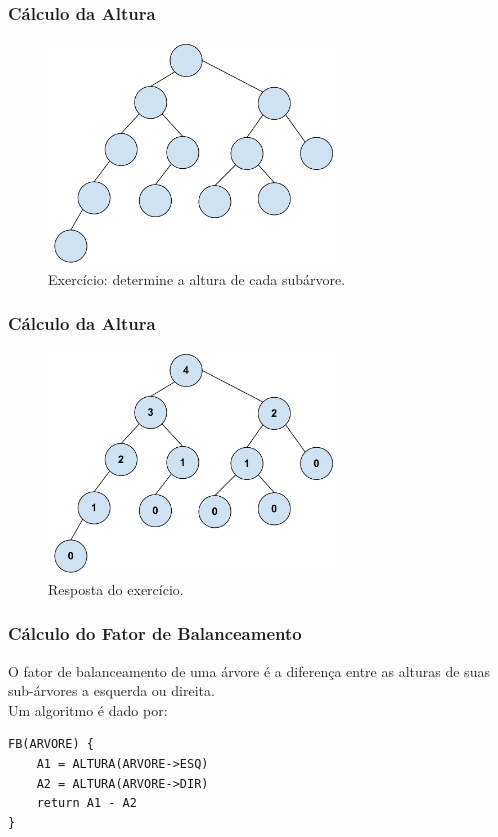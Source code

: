 \begin{frame}
\frametitle{Cálculo da Altura}


\begin{figure}[tbp]
\includegraphics[keepaspectratio=true,width=3in]{figs/fig_arvores/altura1}
\centering
\caption{Exercício: determine a altura de cada subárvore.}
\end{figure}

\end{frame}

\begin{frame}
\frametitle{Cálculo da Altura}

\begin{figure}[tbp]
\includegraphics[keepaspectratio=true,width=3in]{figs/fig_arvores/altura2}
\centering
\caption{Resposta do exercício.}
\end{figure}

\end{frame}

\begin{frame}[fragile]
\frametitle{Cálculo do Fator de Balanceamento}


\begin{block}{}
O fator de balanceamento de uma árvore é a diferença
entre as alturas de suas sub-árvores a esquerda ou direita.\\ 
Um algoritmo é  dado por:
\end{block}

\begin{verbatim}
FB(ARVORE) {
    A1 = ALTURA(ARVORE->ESQ)
    A2 = ALTURA(ARVORE->DIR)
    return A1 - A2 
}
\end{verbatim}
\end{frame}

